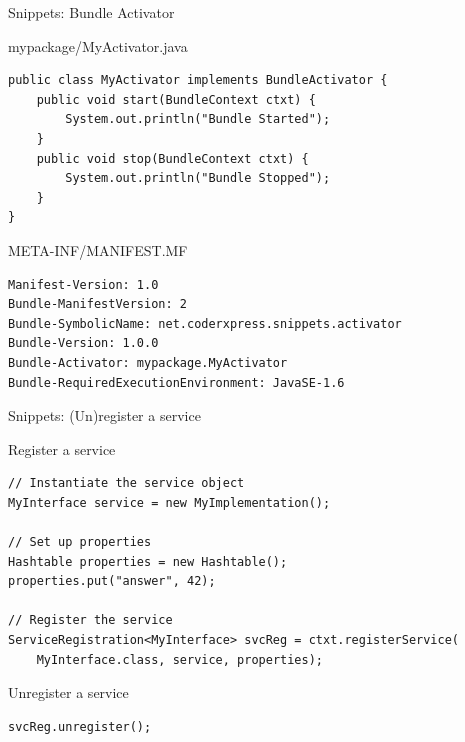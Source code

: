 \begin{frame}[fragile]{Snippets: Bundle Activator}
\begin{small}
\begin{block}{mypackage/MyActivator.java}
\begin{verbatim}
public class MyActivator implements BundleActivator {
	public void start(BundleContext ctxt) {
		System.out.println("Bundle Started");
	}
	public void stop(BundleContext ctxt) {
		System.out.println("Bundle Stopped");
	}
}
\end{verbatim}
\vspace{-.8em}
\end{block}
\begin{block}{META-INF/MANIFEST.MF}
\begin{verbatim}
Manifest-Version: 1.0
Bundle-ManifestVersion: 2
Bundle-SymbolicName: net.coderxpress.snippets.activator
Bundle-Version: 1.0.0
Bundle-Activator: mypackage.MyActivator
Bundle-RequiredExecutionEnvironment: JavaSE-1.6
\end{verbatim}
\vspace{-.8em}
\end{block}
\end{small}
\end{frame}


\begin{frame}[fragile]{Snippets: (Un)register a service}
\begin{small}
\begin{block}{Register a service}
\begin{verbatim}
// Instantiate the service object
MyInterface service = new MyImplementation();

// Set up properties
Hashtable properties = new Hashtable();
properties.put("answer", 42);

// Register the service
ServiceRegistration<MyInterface> svcReg = ctxt.registerService(
	MyInterface.class, service, properties);
\end{verbatim}
\vspace{-.8em}
\end{block}

\begin{block}{Unregister a service}
\begin{verbatim}
svcReg.unregister();
\end{verbatim}
\vspace{-.8em}
\end{block}
\end{small}
\end{frame}

